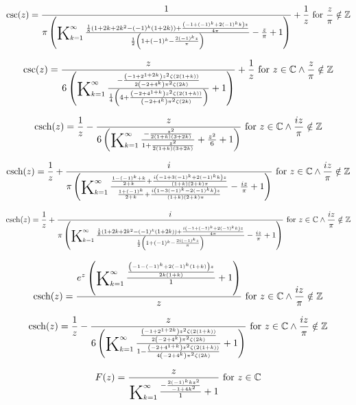 \documentclass{article}
\newcommand{\bigK}{\mathop{\raisebox{-5pt}{\huge K}}}
\begin{document}
\[\csc (z)=\frac{1}{\pi  \left(\bigK_{k=1}^{\infty}\frac{\frac{1}{8} \left(1+2 k+2 k^2-(-1)^k (1+2 k)\right)+\frac{\left(-1+(-1)^k+2 (-1)^k k\right) z}{4 \pi }}{\frac{1}{2} \left(1+(-1)^k-\frac{2 (-1)^k z}{\pi }\right)}-\frac{z}{\pi }+1\right)}+\frac{1}{z}\text{ for }\frac{z}{\pi }\notin \mathbb{Z}\] 

\[\csc (z)=\frac{z}{6 \left(\bigK_{k=1}^{\infty}\frac{-\frac{\left(-1+2^{1+2 k}\right) z^2 \zeta (2 (1+k))}{2 \left(-2+4^k\right) \pi ^2 \zeta (2 k)}}{\frac{1}{4} \left(4+\frac{\left(-2+4^{1+k}\right) z^2 \zeta (2 (1+k))}{\left(-2+4^k\right) \pi ^2 \zeta (2 k)}\right)}+1\right)}+\frac{1}{z}\text{ for }z\in \mathbb{C}\land \frac{z}{\pi }\notin \mathbb{Z}\] 

\[\text{csch}(z)=\frac{1}{z}-\frac{z}{6 \left(\bigK_{k=1}^{\infty}\frac{-\frac{z^2}{2 (1+k) (3+2 k)}}{1+\frac{z^2}{2 (1+k) (3+2 k)}}+\frac{z^2}{6}+1\right)}\text{ for }z\in \mathbb{C}\land \frac{i z}{\pi }\notin \mathbb{Z}\] 

\[\text{csch}(z)=\frac{1}{z}+\frac{i}{\pi  \left(\bigK_{k=1}^{\infty}\frac{\frac{1-(-1)^k+k}{2+k}+\frac{i \left(-1+3 (-1)^k+2 (-1)^k k\right) z}{(1+k) (2+k) \pi }}{\frac{1+(-1)^k}{2+k}+\frac{i \left(1-3 (-1)^k-2 (-1)^k k\right) z}{(1+k) (2+k) \pi }}-\frac{i z}{\pi }+1\right)}\text{ for }z\in \mathbb{C}\land \frac{i z}{\pi }\notin \mathbb{Z}\] 

\[\text{csch}(z)=\frac{1}{z}+\frac{i}{\pi  \left(\bigK_{k=1}^{\infty}\frac{\frac{1}{8} \left(1+2 k+2 k^2-(-1)^k (1+2 k)\right)+\frac{i \left(-1+(-1)^k+2 (-1)^k k\right) z}{4 \pi }}{\frac{1}{2} \left(1+(-1)^k-\frac{2 i (-1)^k z}{\pi }\right)}-\frac{i z}{\pi }+1\right)}\text{ for }z\in \mathbb{C}\land \frac{i z}{\pi }\notin \mathbb{Z}\] 

\[\text{csch}(z)=\frac{e^z \left(\bigK_{k=1}^{\infty}\frac{\frac{\left(-1-(-1)^k+2 (-1)^k (1+k)\right) z}{2 k (1+k)}}{1}+1\right)}{z}\text{ for }z\in \mathbb{C}\land \frac{i z}{\pi }\notin \mathbb{Z}\] 

\[\text{csch}(z)=\frac{1}{z}-\frac{z}{6 \left(\bigK_{k=1}^{\infty}\frac{\frac{\left(-1+2^{1+2 k}\right) z^2 \zeta (2 (1+k))}{2 \left(-2+4^k\right) \pi ^2 \zeta (2 k)}}{1-\frac{\left(-2+4^{1+k}\right) z^2 \zeta (2 (1+k))}{4 \left(-2+4^k\right) \pi ^2 \zeta (2 k)}}+1\right)}\text{ for }z\in \mathbb{C}\land \frac{i z}{\pi }\notin \mathbb{Z}\] 

\[F(z)=\frac{z}{\bigK_{k=1}^{\infty}\frac{-\frac{2 (-1)^k k z^2}{-1+4 k^2}}{1}+1}\text{ for }z\in \mathbb{C}\] 
\end{document}
